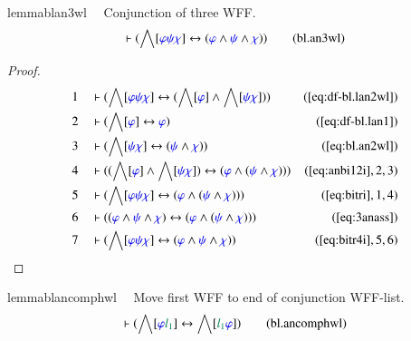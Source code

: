 \begin{restatable}{lemma}{blan3wl}~~ Conjunction of three WFF.
\begin{align}
\vdash ( \bigwedge[ \mw{\varphi} \mw{\psi} \mw{\chi} ] \leftrightarrow (
    \mw{\varphi} \wedge \mw{\psi} \wedge \mw{\chi} )
    )\label{eq:bl.an3wl}\tag{bl.an3wl}
\end{align}
\end{restatable}

\begin{proof}
\begin{align}
  1 &&  & \vdash ( \bigwedge[ \mw{\varphi} \mw{\psi} \mw{\chi} ]
      \leftrightarrow ( \bigwedge[ \mw{\varphi} ] \wedge
      \bigwedge[ \mw{\psi} \mw{\chi} ] )
      )&(\mbox{\ref{eq:df-bl.lan2wl}})\notag
  \\ 2 &&  & \vdash ( \bigwedge[ \mw{\varphi} ] \leftrightarrow \mw{\varphi}
      )&(\mbox{\ref{eq:df-bl.lan1}})\notag
  \\ 3 &&  & \vdash ( \bigwedge[ \mw{\psi} \mw{\chi} ] \leftrightarrow (
      \mw{\psi} \wedge \mw{\chi} )
      )&(\mbox{\ref{eq:bl.an2wl}})\notag
  \\ 4 &&  & \vdash ( ( \bigwedge[ \mw{\varphi} ] \wedge \bigwedge[ \mw{\psi}
      \mw{\chi} ] ) \leftrightarrow ( \mw{\varphi} \wedge (
      \mw{\psi} \wedge \mw{\chi} ) )
      )&(\mbox{\ref{eq:anbi12i}},2,3)\notag
  \\ 5 &&  & \vdash ( \bigwedge[ \mw{\varphi} \mw{\psi} \mw{\chi} ]
      \leftrightarrow ( \mw{\varphi} \wedge ( \mw{\psi}
      \wedge \mw{\chi} ) )
      )&(\mbox{\ref{eq:bitri}},1,4)\notag
  \\ 6 &&  & \vdash ( ( \mw{\varphi} \wedge \mw{\psi} \wedge \mw{\chi} )
      \leftrightarrow ( \mw{\varphi} \wedge ( \mw{\psi}
      \wedge \mw{\chi} ) ) )&(\mbox{\ref{eq:3anass}})\notag
  \\ 7 &&  & \vdash ( \bigwedge[ \mw{\varphi} \mw{\psi} \mw{\chi} ]
      \leftrightarrow ( \mw{\varphi} \wedge \mw{\psi}
      \wedge \mw{\chi} )
      )&(\mbox{\ref{eq:bitr4i}},5,6)\notag
\end{align}
\end{proof}

\begin{restatable}{lemma}{blancomphwl}~~ Move first WFF to end of conjunction
WFF-list.
\begin{align}
\vdash ( \bigwedge[ \mw{\varphi} \mwl{l_1} ] \leftrightarrow \bigwedge[
    \mwl{l_1} \mw{\varphi} ] )\label{eq:bl.ancomphwl}\tag{bl.ancomphwl}
\end{align}
\end{restatable}


